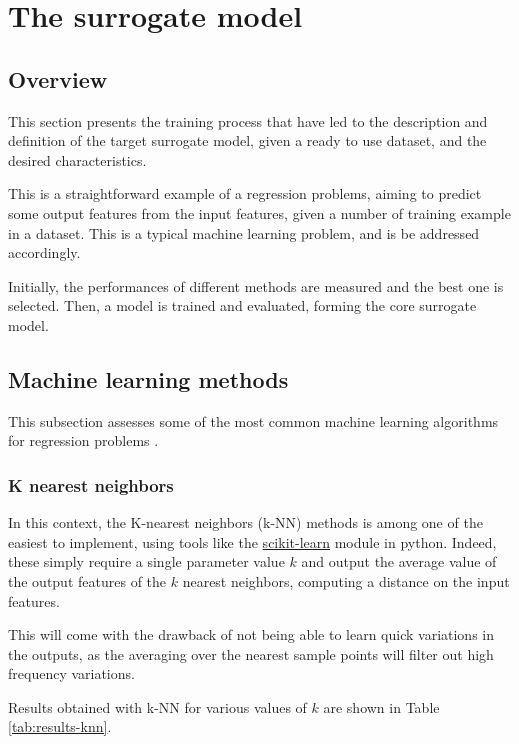 \section{The surrogate model}

\subsection{Overview}

This section presents the training process that have led to the description and definition of the target surrogate model, given a ready to use dataset, and the desired characteristics.

This is a straightforward example of a regression problems, aiming to predict some output features from the input features, given a number of training example in a dataset. This is a typical machine learning problem, and is be addressed accordingly.

Initially, the performances of different methods are measured and the best one is selected. Then, a model is trained and evaluated, forming the core surrogate model.

\subsection{Machine learning methods}

This subsection assesses some of the most common machine learning algorithms for regression problems \cite{machine-learning-class}.

\subsubsection{K nearest neighbors}

In this context, the K-nearest neighbors (k-NN) methods is among one of the easiest to implement, using tools like the \href{https://scikit-learn.org/stable/modules/neighbors.html\#nearest-neighbors-regression}{scikit-learn} \cite{scikit-learn} module in python. Indeed, these simply require a single parameter value $k$ and output the average value of the output features of the $k$ nearest neighbors, computing a distance on the input features.

This will come with the drawback of not being able to learn quick variations in the outputs, as the averaging over the nearest sample points will filter out high frequency variations.

Results obtained with k-NN for various values of $k$ are shown in Table \ref{tab:results-knn}.

